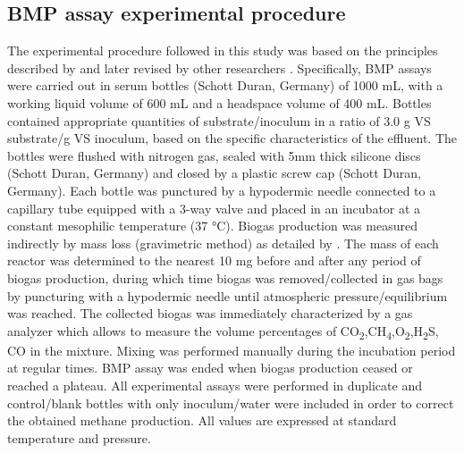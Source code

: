 \subsection{BMP assay experimental procedure}
The experimental procedure followed in this study was based on the principles described by \cite{Owen_1979} and later revised by other researchers \cite{Angelidaki_2009,Holliger_2016}. Specifically, BMP assays were carried out in serum bottles (Schott Duran, Germany) of 1000 mL, with a working liquid volume of 600 mL and a headspace volume of 400 mL. Bottles contained appropriate quantities of substrate/inoculum in a ratio of 3.0 g VS substrate/g VS inoculum, based on the specific characteristics of the effluent. The bottles were flushed with nitrogen gas, sealed with 5mm thick silicone discs (Schott Duran, Germany) and closed by a plastic screw cap (Schott Duran, Germany). Each bottle was punctured by a hypodermic needle connected to a capillary tube equipped with a 3-way valve and placed in an incubator at a constant mesophilic temperature (37 °C). Biogas production was measured indirectly by mass loss (gravimetric method) as detailed by \cite{Hafner_2015}. The mass of each reactor was determined to the nearest 10 mg before and after any period of biogas production, during which time biogas was removed/collected in gas bags by puncturing with a hypodermic needle until atmospheric pressure/equilibrium was reached. The collected biogas was immediately characterized by a gas analyzer which allows to measure the volume percentages of CO\textsubscript{2},CH\textsubscript{4},O\textsubscript{2},H\textsubscript{2}S, CO in the mixture. Mixing was performed manually during the incubation period at regular times. BMP assay was ended when biogas production ceased or reached a plateau. All experimental assays were performed in duplicate and control/blank bottles with only inoculum/water were included in order to correct the obtained methane production.  All values are expressed at standard temperature and pressure.
